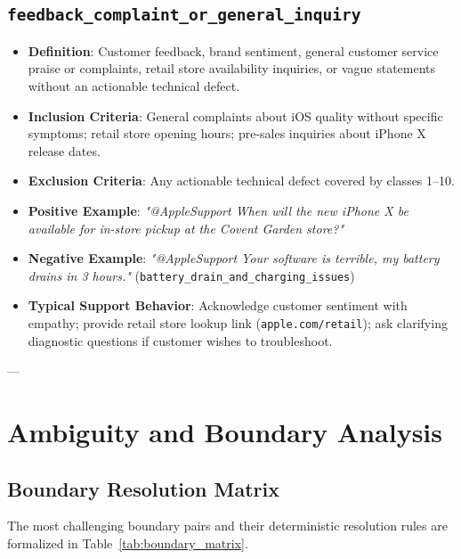 \documentclass[11pt,a4paper]{article}
\begin{document}
\subsection{\texttt{feedback\_complaint\_or\_general\_inquiry}}
\begin{itemize}[leftmargin=*]
    \item \textbf{Definition}: Customer feedback, brand sentiment, general customer service praise or complaints, retail store availability inquiries, or vague statements without an actionable technical defect.
    \item \textbf{Inclusion Criteria}: General complaints about iOS quality without specific symptoms; retail store opening hours; pre-sales inquiries about iPhone X release dates.
    \item \textbf{Exclusion Criteria}: Any actionable technical defect covered by classes 1--10.
    \item \textbf{Positive Example}: \textit{"@AppleSupport When will the new iPhone X be available for in-store pickup at the Covent Garden store?"}
    \item \textbf{Negative Example}: \textit{"@AppleSupport Your software is terrible, my battery drains in 3 hours."} (\texttt{battery\_drain\_and\_charging\_issues})
    \item \textbf{Typical Support Behavior}: Acknowledge customer sentiment with empathy; provide retail store lookup link (\texttt{apple.com/retail}); ask clarifying diagnostic questions if customer wishes to troubleshoot.
\end{itemize}

---

\section{Ambiguity and Boundary Analysis}

\subsection{Boundary Resolution Matrix}
The most challenging boundary pairs and their deterministic resolution rules are formalized in Table~\ref{tab:boundary_matrix}.
\end{document}
